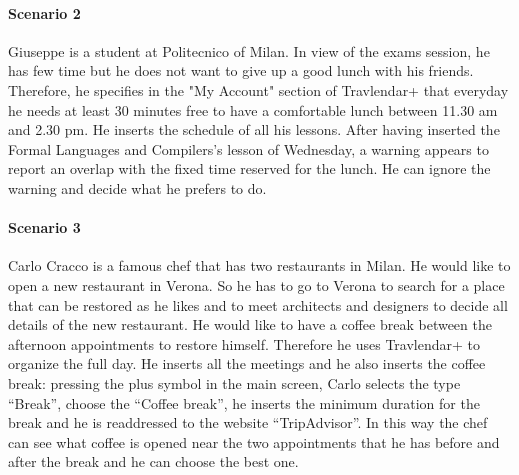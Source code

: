 \documentclass[12pt,titlepage]{article}
\begin{document}
\paragraph{Scenario 2}
Giuseppe is a student at Politecnico of Milan. In view of the exams session, he has few time but he does not want to give up a good lunch with his friends. Therefore, he specifies in the "My Account" section of Travlendar+ that everyday he needs at least 30 minutes free to have a comfortable lunch between 11.30 am and 2.30 pm. He inserts the schedule of all his lessons. After having inserted the Formal Languages and Compilers's lesson of Wednesday, a warning appears to report an overlap with the fixed time reserved for the lunch. He can ignore the warning and decide what he prefers to do.

\paragraph{Scenario 3}
Carlo Cracco is a famous chef that has two restaurants in Milan. He would like to open a new restaurant in Verona. So he has to go to Verona to search for a place that can be restored as he likes and to meet architects and designers to decide all details of the new restaurant. He would like to have a coffee break between the afternoon appointments to restore himself. Therefore he uses Travlendar+ to organize the full day. He inserts all the meetings and he also inserts the coffee break: pressing the plus symbol in the main screen, Carlo selects the type ``Break'', choose the ``Coffee break'', he inserts the minimum duration for the break and he is readdressed to the website ``TripAdvisor''. In this way the chef can see what coffee is opened near the two appointments that he has before and after the break and he can choose the best one.
\end{document}
